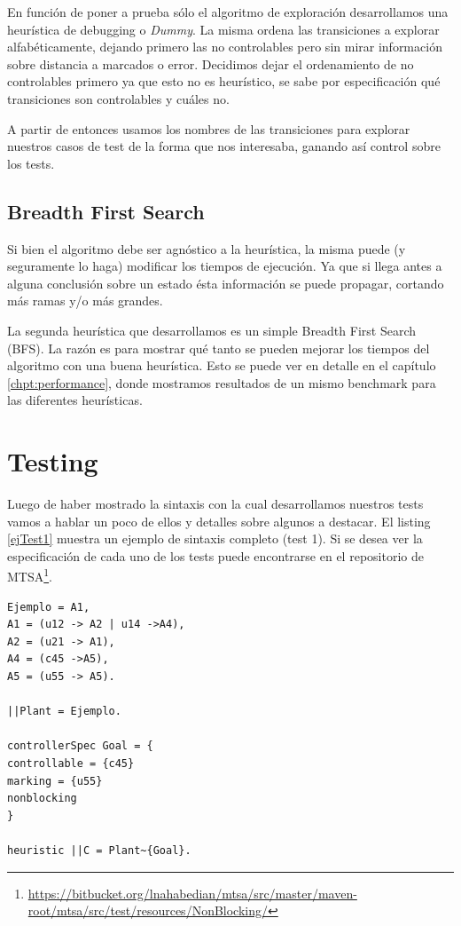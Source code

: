 En función de poner a prueba sólo el algoritmo de exploración desarrollamos una heurística de debugging o \textit{Dummy}. La misma ordena las transiciones a explorar alfabéticamente, dejando primero las no controlables pero sin mirar información sobre distancia a marcados o error. Decidimos dejar el ordenamiento de no controlables primero ya que esto no es heurístico, se sabe por especificación qué transiciones son controlables y cuáles no.

A partir de entonces usamos los nombres de las transiciones para explorar nuestros casos de test de la forma que nos interesaba, ganando así control sobre los tests.

\subsection{Breadth First Search}
Si bien el algoritmo debe ser agnóstico a la heurística, la misma puede (y seguramente lo haga) modificar los tiempos de ejecución. Ya que si llega antes a alguna conclusión sobre un estado ésta información se puede propagar, cortando más ramas y/o más grandes.

La segunda heurística que desarrollamos es un simple Breadth First Search (BFS). La razón es para mostrar qué tanto se pueden mejorar los tiempos del algoritmo con una buena heurística. Esto se puede ver en detalle en el capítulo \ref{chpt:performance}, donde mostramos resultados de un mismo benchmark para las diferentes heurísticas.

\section{Testing}\label{chpt:testing}
Luego de haber mostrado la sintaxis con la cual desarrollamos nuestros tests vamos a hablar un poco de ellos y detalles sobre algunos a destacar. El listing \ref{ejTest1} muestra un ejemplo de sintaxis completo (test 1). Si se desea ver la especificación de cada uno de los tests puede encontrarse en el repositorio de MTSA\footnote{\href{https://bitbucket.org/lnahabedian/mtsa/src/master/maven-root/mtsa/src/test/resources/NonBlocking/}{https://bitbucket.org/lnahabedian/mtsa/src/master/maven-root/mtsa/src/test/resources/NonBlocking/}}.

\begin{lstlisting}[language = mtsa, caption=Test 1 a modo de ejemplo, label=ejTest1] 
Ejemplo = A1,
A1 = (u12 -> A2 | u14 ->A4),
A2 = (u21 -> A1),
A4 = (c45 ->A5),
A5 = (u55 -> A5).

||Plant = Ejemplo.

controllerSpec Goal = {
controllable = {c45}
marking = {u55}
nonblocking
}

heuristic ||C = Plant~{Goal}.
\end{lstlisting}

